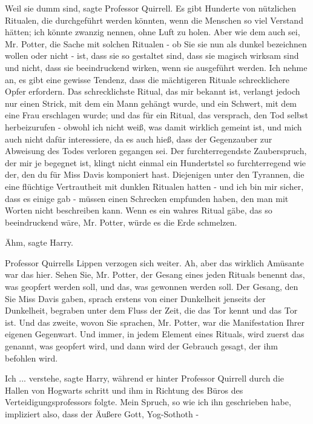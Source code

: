 \glqq{}Weil sie dumm sind\grqq{}, sagte Professor Quirrell. \glqq{}Es gibt
Hunderte von nützlichen Ritualen, die durchgeführt werden könnten, wenn die
Menschen so viel Verstand hätten; ich könnte zwanzig nennen, ohne Luft zu holen.
Aber wie dem auch sei, Mr. Potter, die Sache mit solchen Ritualen - ob Sie sie
nun als dunkel bezeichnen wollen oder nicht - ist, dass sie so gestaltet sind,
dass sie magisch wirksam sind und nicht, dass sie beeindruckend wirken, wenn sie
ausgeführt werden. Ich nehme an, es gibt eine gewisse Tendenz, dass die
mächtigeren Rituale schrecklichere Opfer erfordern. Das schrecklichste Ritual,
das mir bekannt ist, verlangt jedoch nur einen Strick, mit dem ein Mann gehängt
wurde, und ein Schwert, mit dem eine Frau erschlagen wurde; und das für ein
Ritual, das versprach, den Tod selbst herbeizurufen - obwohl ich nicht weiß, was
damit wirklich gemeint ist, und mich auch nicht dafür interessiere, da es auch
hieß, dass der Gegenzauber zur Abweisung des Todes verloren gegangen sei. Der
furchterregendste Zauberspruch, der mir je begegnet ist, klingt nicht einmal ein
Hundertstel so furchterregend wie der, den du für Miss Davis komponiert hast.
Diejenigen unter den Tyrannen, die eine flüchtige Vertrautheit mit dunklen
Ritualen hatten - und ich bin mir sicher, dass es einige gab - müssen einen
Schrecken empfunden haben, den man mit Worten nicht beschreiben kann. Wenn es
ein wahres Ritual gäbe, das so beeindruckend wäre, Mr. Potter, würde es die Erde
schmelzen.\grqq{}

\glqq{}Ähm\grqq{}, sagte Harry.

Professor Quirrells Lippen verzogen sich weiter. \glqq{}Ah, aber das wirklich
Amüsante war das hier. Sehen Sie, Mr. Potter, der Gesang eines jeden Rituals
benennt das, was geopfert werden soll, und das, was gewonnen werden soll. Der
Gesang, den Sie Miss Davis gaben, sprach erstens von einer Dunkelheit jenseits
der Dunkelheit, begraben unter dem Fluss der Zeit, die das Tor kennt und das Tor
ist. Und das zweite, wovon Sie sprachen, Mr. Potter, war die Manifestation Ihrer
eigenen Gegenwart. Und immer, in jedem Element eines Rituals, wird zuerst das
genannt, was geopfert wird, und dann wird der Gebrauch gesagt, der ihm befohlen
wird.\grqq{}

\glqq{}Ich ... verstehe\grqq{}, sagte Harry, während er hinter Professor Quirrell
durch die Hallen von Hogwarts schritt und ihm in Richtung des Büros des
Verteidigungsprofessors folgte. \glqq{}Mein Spruch, so wie ich ihn geschrieben
habe, impliziert also, dass der Äußere Gott, Yog-Sothoth -\grqq{}

